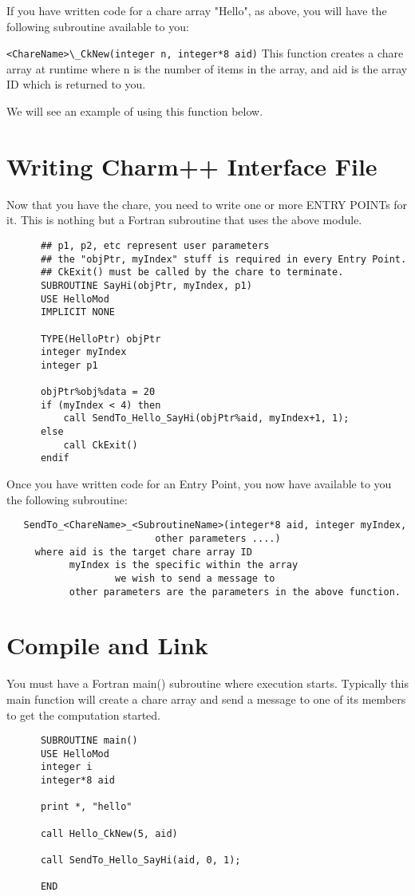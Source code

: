 \documentclass[11pt]{article}
\begin{document}
If you have written code for a chare array "Hello", as above, you will
have the following subroutine available to you:

  \verb+<ChareName>\_CkNew(integer n, integer*8 aid)+
     This function creates a chare array at runtime
     where n is the number of items in the array, and
           aid is the array ID which is returned to you.

We will see an example of using this function below.

\section{Writing Charm++ Interface File}

Now that you have the chare, you need to write one or more ENTRY
POINTs for it.  This is nothing but a Fortran subroutine that uses the
above module.
\begin{verbatim}
      ## p1, p2, etc represent user parameters
      ## the "objPtr, myIndex" stuff is required in every Entry Point.
      ## CkExit() must be called by the chare to terminate.
      SUBROUTINE SayHi(objPtr, myIndex, p1)
      USE HelloMod
      IMPLICIT NONE

      TYPE(HelloPtr) objPtr
      integer myIndex
      integer p1

      objPtr%obj%data = 20
      if (myIndex < 4) then
          call SendTo_Hello_SayHi(objPtr%aid, myIndex+1, 1);
      else 
          call CkExit()
      endif
\end{verbatim}
Once you have written code for an Entry Point, you now have available
to you the following subroutine:
\begin{verbatim}
   SendTo_<ChareName>_<SubroutineName>(integer*8 aid, integer myIndex,
                          other parameters ....)
     where aid is the target chare array ID
           myIndex is the specific within the array
                   we wish to send a message to
           other parameters are the parameters in the above function.
\end{verbatim}

\section{Compile and Link}
You must have a Fortran main() subroutine where execution starts.
Typically this main function will create a chare array and send a
message to one of its members to get the computation started.
\begin{verbatim}
      SUBROUTINE main()
      USE HelloMod
      integer i
      integer*8 aid

      print *, "hello"

      call Hello_CkNew(5, aid)

      call SendTo_Hello_SayHi(aid, 0, 1);

      END
\end{verbatim}
\end{document}
